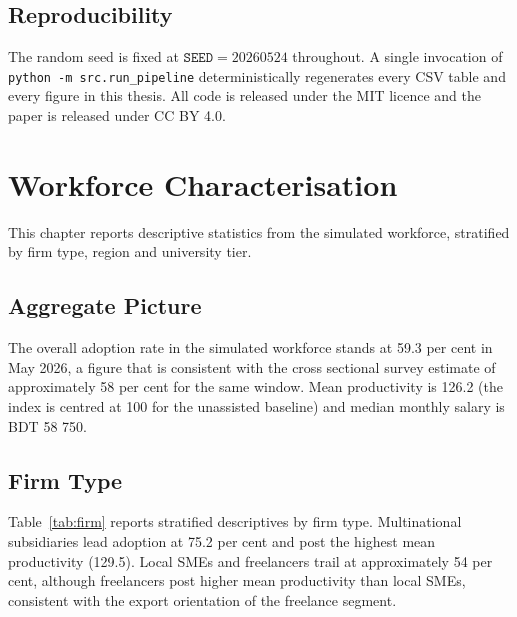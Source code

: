\documentclass[11pt,a4paper]{report}
\begin{document}
\section{Reproducibility}

The random seed is fixed at $\mathtt{SEED} = 20260524$ throughout. A
single invocation of \texttt{python -m src.run\_pipeline} deterministically
regenerates every CSV table and every figure in this thesis. All code
is released under the MIT licence and the paper is released under
CC BY 4.0.

\chapter{Workforce Characterisation}

This chapter reports descriptive statistics from the simulated workforce,
stratified by firm type, region and university tier.

\section{Aggregate Picture}

The overall adoption rate in the simulated workforce stands at
59.3 per cent in May 2026, a figure that is consistent with the
\citet{IslamKabir2025} cross sectional survey estimate of approximately
58 per cent for the same window. Mean productivity is 126.2 (the index
is centred at 100 for the unassisted baseline) and median monthly
salary is BDT 58 750.

\section{Firm Type}

Table~\ref{tab:firm} reports stratified descriptives by firm type.
Multinational subsidiaries lead adoption at 75.2 per cent and post the
highest mean productivity (129.5). Local SMEs and freelancers trail at
approximately 54 per cent, although freelancers post higher mean
productivity than local SMEs, consistent with the export orientation of
the freelance segment.
\end{document}
